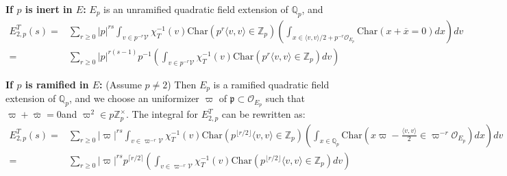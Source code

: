 \documentclass[12pt]{article}
\theoremstyle{remark}
\theoremstyle{definition}
\newcommand{\oo}{\mathcal{O}}
\newcommand{\Z}{\mathbb{Z}}
\newcommand{\Q}{\mathbb{Q}}
\newcommand{\lrangle}[2]{\langle #1,#2\rangle}
\newcommand{\rmm}[1]{\mathrm{#1}}
\newcommand{\call}[1]{\mathcal{#1}}
\newcommand{\frakk}[1]{\mathfrak{#1}}
\begin{document}
\textbf{If $p$ is inert in $E$:}
$E_{p}$ is an unramified quadratic field extension of $\Q_{p}$, 
and 
\begin{align*}
    E_{2,p}^{T}(s)=&\sum_{r\geq 0}|p|^{rs}\int_{v\in p^{-r}\call{V}}\chi_{T}^{-1}(v)\rmm{Char}(p^{r}\lrangle{v}{v}\in\Z_{p})\left(\int_{x\in\lrangle{v}{v}/2+p^{-r}\oo_{E_{p}}}\rmm{Char}(x+\overline{x}=0)dx\right)dv\\
    =&\sum_{r\geq 0}|p|^{r(s-1)}p^{-1}\left(\int_{v\in p^{-r}\call{V}}\chi_{T}^{-1}(v)\rmm{Char}(p^{r}\lrangle{v}{v}\in\Z_{p})dv\right)
\end{align*}

\textbf{If $p$ is ramified in $E$:}
(Assume $p\neq 2$)
Then $E_{p}$ is a ramified quadratic field extension of $\Q_{p}$,
and we choose an uniformizer $\varpi$ of $\frakk{p}\subset\oo_{E_{p}}$ such that $\varpi+\overline{\varpi}=0$and $\varpi^{2}\in p\Z_{p}^{\times}$.
The integral for $E_{2,p}^{T}$ can be rewritten as:
\begin{align*}
    E_{2,p}^{T}(s)=&\sum_{r\geq 0}|\varpi|^{rs}\int_{v\in \varpi^{-r}\call{V}}\chi_{T}^{-1}(v)\rmm{Char}(p^{\lfloor r/2\rfloor}\lrangle{v}{v}\in \Z_{p})\left(\int_{x\in\Q_{p}}\rmm{Char}(x\varpi-\frac{\lrangle{v}{v}}{2}\in \varpi^{-r}\oo_{E_{p}})dx\right)dv\\
    =&\sum_{r\geq 0}|\varpi|^{rs}p^{\lceil r/2 \rceil}\left(\int_{v\in \varpi^{-r}\call{V}}\chi_{T}^{-1}(v)\rmm{Char}(p^{\lfloor r/2\rfloor}\lrangle{v}{v}\in\Z_{p})dv\right)
\end{align*} 
\end{document}

